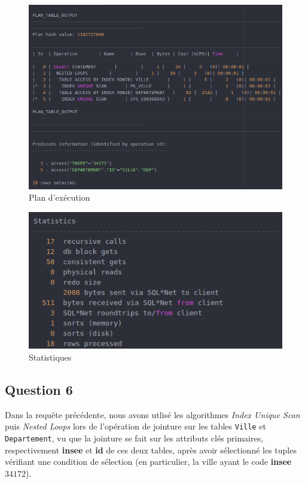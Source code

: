 \documentclass[a4paper,12pt]{article}
\begin{document}
\begin{figure}[!ht]
  \centering
  \includegraphics[scale=0.6]{images/q5_1.png}
  \caption{Plan d'exécution}
\end{figure}

\begin{figure}[!ht]
  \centering
  \includegraphics[scale=0.6]{images/q5_2.png}
  \caption{Statistiques}
\end{figure}

\subsection{Question 6}
Dans la requête précédente, nous avons utlisé les algorithmes \textit{Index Unique Scan} puis \textit{Nested Loops} lors de l'opération de jointure sur les tables \texttt{Ville} et \texttt{Departement}, vu que la jointure se fait sur les attributs clés primaires, respectivement \textbf{insee} et \textbf{id} de ces deux tables, après avoir sélectionné les tuples vérifiant une condition de sélection (en particulier, la ville ayant le code \textbf{insee} $34172$).
\end{document}
